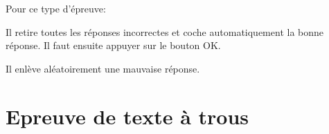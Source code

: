\documentclass[11pt]{scrreprt}
\begin{document}
    Pour ce type d'épreuve:
    \begin{description}[style=nextline]
        \item[Bouton de triche]Il retire toutes les réponses incorrectes et coche automatiquement la bonne réponse. Il faut ensuite appuyer sur le bouton OK.
        \item[Bouton d'aide]Il enlève aléatoirement une mauvaise réponse.
    \end{description}

    \section{Epreuve de texte à trous}
    \begin{figure}[H]
        \centering
        \mbox{\quad\quad\quad
}
\end{figure}
\end{document}
